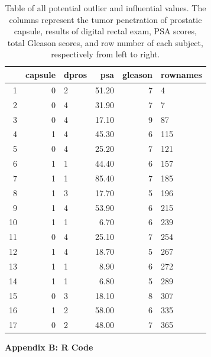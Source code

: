 \documentclass[11pt]{article}\usepackage[]{graphicx}\usepackage[]{color}
\begin{document}
\begin{center}
\begin{table}[ht]
\centering
\begin{tabular}{rrlrrl}
  \hline
 & capsule & dpros & psa & gleason & rownames \\ 
  \hline
1 &   0 & 2 & 51.20 &   7 & 4 \\ 
  2 &   0 & 4 & 31.90 &   7 & 7 \\ 
  3 &   0 & 4 & 17.10 &   9 & 87 \\ 
  4 &   1 & 4 & 45.30 &   6 & 115 \\ 
  5 &   0 & 4 & 25.20 &   7 & 121 \\ 
  6 &   1 & 1 & 44.40 &   6 & 157 \\ 
  7 &   1 & 1 & 85.40 &   7 & 185 \\ 
  8 &   1 & 3 & 17.70 &   5 & 196 \\ 
  9 &   1 & 4 & 53.90 &   6 & 215 \\ 
  10 &   1 & 1 & 6.70 &   6 & 239 \\ 
  11 &   0 & 4 & 25.10 &   7 & 254 \\ 
  12 &   1 & 4 & 18.70 &   5 & 267 \\ 
  13 &   1 & 1 & 8.90 &   6 & 272 \\ 
  14 &   1 & 1 & 6.80 &   5 & 289 \\ 
  15 &   0 & 3 & 18.10 &   8 & 307 \\ 
  16 &   1 & 2 & 58.00 &   6 & 335 \\ 
  17 &   0 & 2 & 48.00 &   7 & 365 \\ 
   \hline
\end{tabular}
\caption{Table of all potential outlier and influential values. The columns represent the tumor penetration of prostatic capsule, results of digital rectal exam, PSA scores, total Gleason scores, and row number of each subject, respectively from left to right.} 
\label{outlier_obs}
\end{table}

\end{center}


\clearpage
\newpage
\noindent \Large{{\bf Appendix B: R Code}}

\end{document}
